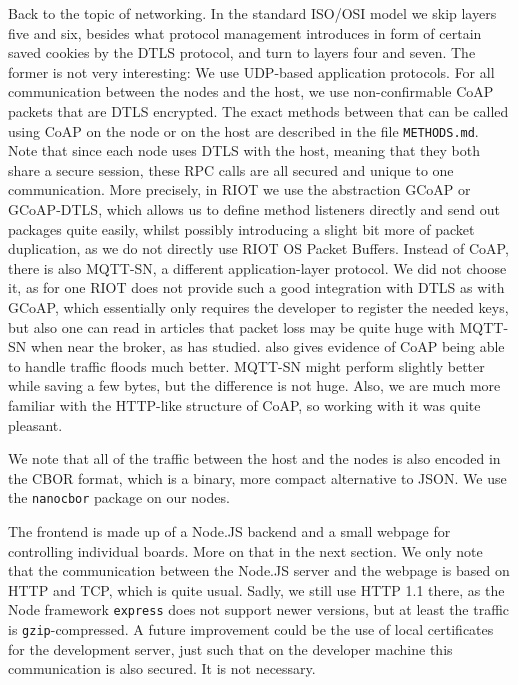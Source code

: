 \documentclass[acmtog, language=english, nonacm]{acmart}
\begin{document}
    Back to the topic of networking. In the standard ISO/OSI model we skip layers five and six, besides what protocol management introduces in form of certain saved cookies by the DTLS protocol, and turn to layers four and seven. The former is not very interesting: We use UDP-based application protocols. For all communication between the nodes and the host, we use non-confirmable CoAP packets that are DTLS encrypted. The exact methods between that can be called using CoAP on the node or on the host are described in the file \texttt{METHODS.md}. Note that since each node uses DTLS with the host, meaning that they both share a secure session, these RPC calls are all secured and unique to one communication. More precisely, in RIOT we use the abstraction GCoAP or GCoAP-DTLS, which allows us to define method listeners directly and send out packages quite easily, whilst possibly introducing a slight bit more of packet duplication, as we do not directly use RIOT OS Packet Buffers. Instead of CoAP, there is also MQTT-SN, a different application-layer protocol. We did not choose it, as for one RIOT does not provide such a good integration with DTLS as with GCoAP, which essentially only requires the developer to register the needed keys, but also one can read in articles that packet loss may be quite huge with MQTT-SN when near the broker, as \cite{Waehlisch_2021} has studied. \cite{Herrero_2020} also gives evidence of CoAP being able to handle traffic floods much better. MQTT-SN might perform slightly better while saving a few bytes, but the difference is not huge. Also, we are much more familiar with the HTTP-like structure of CoAP, so working with it was quite pleasant.

    We note that all of the traffic between the host and the nodes is also encoded in the CBOR format, which is a binary, more compact alternative to JSON. We use the \texttt{nanocbor} package on our nodes.

    The frontend is made up of a Node.JS backend and a small webpage for controlling individual boards. More on that in the next section. We only note that the communication between the Node.JS server and the webpage is based on HTTP and TCP, which is quite usual. Sadly, we still use HTTP 1.1 there, as the Node framework \texttt{express} does not support newer versions, but at least the traffic is \texttt{gzip}-compressed. A future improvement could be the use of local certificates for the development server, just such that on the developer machine this communication is also secured. It is not necessary.
\end{document}
